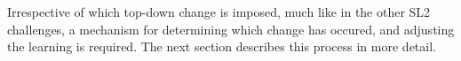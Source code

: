 \documentclass{article}
\begin{document}
Irrespective of which top-down change is imposed, much like in the other SL2 challenges, a mechanism for determining which change has occured, and adjusting the learning is required.  The next section describes this process in more detail. 










\end{document}
